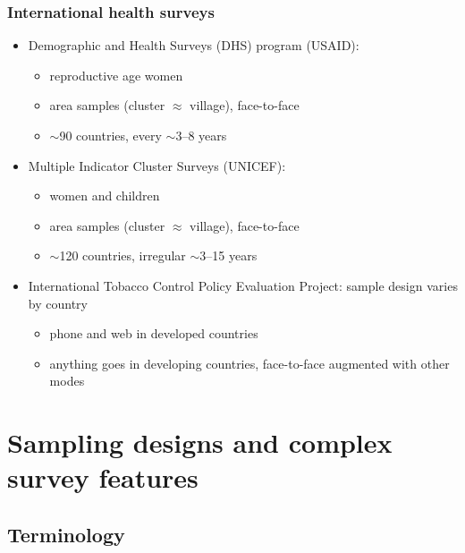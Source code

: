 \documentclass[aspectratio=43]{beamer}
\begin{document}
\begin{frame}\frametitle{International health surveys}

\begin{itemize}
    \item Demographic and Health Surveys (DHS) program (USAID):
    \begin{itemize}
        \item reproductive age women
        \item area samples (cluster $\approx$ village), face-to-face
        \item $\sim$90 countries, every $\sim$3--8 years
    \end{itemize}
    \item Multiple Indicator Cluster Surveys (UNICEF):
    \begin{itemize}
        \item women and children
        \item area samples (cluster $\approx$ village), face-to-face
        \item $\sim$120 countries, irregular $\sim$3--15 years
    \end{itemize}
    \item International Tobacco Control Policy Evaluation Project: sample design varies by country
    \begin{itemize}
        \item phone and web in developed countries
        \item anything goes in developing countries, face-to-face augmented with other modes
    \end{itemize}
\end{itemize}

\end{frame}

\section{Sampling designs and complex survey features}

\subsection{Terminology}
\end{document}
